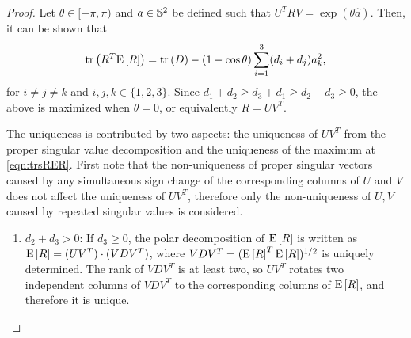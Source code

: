 \begin{proof}
	Let $\theta\in[-\pi,\pi)$ and $a\in\mathbb{S}^2$ be defined such that $U^T R V = \exp(\theta\hat a)$. 
	Then, it can be shown that
	\begin{align} \label{eqn:observability-trsRER}
		\mathrm{tr}\left( R^T \mathrm{E}\left[ R \right] \right) = \mathrm{tr}\left( D \right) - (1-\cos\theta) \sum_{i=1}^3 (d_i+d_j) a_k^2,
	\end{align}
	for $i\neq j\neq k$ and $i,j,k\in\{1,2,3\}$.
	Since $d_1+d_2 \geq d_3+d_1 \geq d_2 +d_3 \geq 0$, the above is maximized when $\theta=0$, or equivalently $R= UV^T$. 
	
	The uniqueness is contributed by two aspects: the uniqueness of $UV^T$ from the proper singular value decomposition and the uniqueness of the maximum at \eqref{eqn:trsRER}.
	First note that the non-uniqueness of proper singular vectors caused by any simultaneous sign change of the corresponding columns of $U$ and $V$ does not affect the uniqueness of $UV^T$, therefore only the non-uniqueness of $U,V$ caused by repeated singular values is considered.
	\begin{enumerate}
		\item $d_2+d_3 >0$:
		If $d_3\geq 0$, the polar decomposition of $\mathrm{E}\left[ R \right]$ is written as $\mathrm{E}\left[ R \right] = (UV^T) \cdot (VDV^T)$, where $VDV^T = (\mathrm{E}\left[ R \right]^T\mathrm{E}\left[ R \right])^{1/2}$ is uniquely determined.
		The rank of $VDV^T$ is at least two, so $UV^T$ rotates two independent columns of $VDV^T$ to the corresponding columns of $\mathrm{E}\left[ R \right]$, and therefore it is unique.
		

\end{enumerate}
\end{proof}
